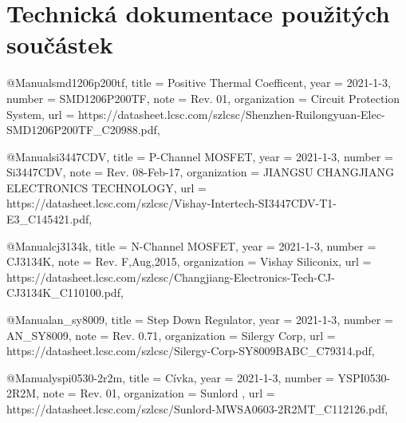 \section{Technická dokumentace použitých součástek}

@Manual{smd1206p200tf,
    title        = {Positive Thermal Coefficent},
    year         = {2021-1-3},
    number       = {SMD1206P200TF},
    note         = {Rev. 01},
    organization = {Circuit Protection System},
    url          = {https://datasheet.lcsc.com/szlcsc/Shenzhen-Ruilongyuan-Elec-SMD1206P200TF\_C20988.pdf},
}

@Manual{si3447CDV,
    title        = {P-Channel MOSFET},
    year         = {2021-1-3},
    number       = {Si3447CDV},
    note         = {Rev. 08-Feb-17},
    organization = {JIANGSU CHANGJIANG ELECTRONICS TECHNOLOGY},
    url          = {https://datasheet.lcsc.com\-/szlcsc/Vishay-Intertech-SI3447CDV-T1-E3\_C145421.pdf},
}

@Manual{cj3134k,
    title        = {N-Channel MOSFET},
    year         = {2021-1-3},
    number       = {CJ3134K},
    note         = {Rev. F,Aug,2015},
    organization = {Vishay Siliconix},
    url          = {https://datasheet.lcsc.com/szlcsc/Changjiang-Electronics-Tech-CJ-CJ3134K\-\_C110100.pdf},
}

@Manual{an\_sy8009,
    title        = {Step Down Regulator},
    year         = {2021-1-3},
    number       = {AN\_SY8009},
    note         = {Rev. 0.71},
    organization = {Silergy Corp},
    url          = {https://datasheet.lcsc.com/szlcsc/Silergy-Corp-SY8009BABC\_C79314.pdf},
}

@Manual{yspi0530-2r2m,
    title        = {Cívka},
    year         = {2021-1-3},
    number       = {YSPI0530-2R2M},
    note         = {Rev. 01},
    organization = {Sunlord },
    url          = {https://datasheet.lcsc.com\-/szlcsc/Sunlord-MWSA0603-2R2MT\_C112126.pdf},
}

